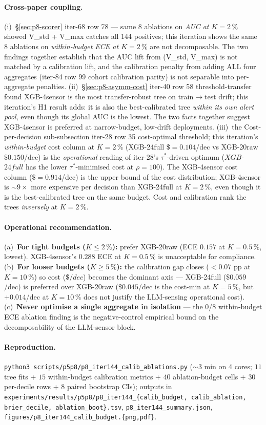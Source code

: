 \paragraph{Cross-paper coupling.}
(i)~\S\ref{sec:p8-scorer} iter-68 row 78 --- same 8 ablations on
\emph{AUC at $K{=}2\,\%$} showed V\_std + V\_max catches all 144
positives; this iteration shows the same 8 ablations on
\emph{within-budget ECE at $K{=}2\,\%$} are not decomposable. The
two findings together establish that the AUC lift from
(V\_std, V\_max) is not matched by a calibration lift, and the
calibration penalty from adding ALL four aggregates (iter-84 row
99 cohort calibration parity) is not separable into per-aggregate
penalties. (ii)~\S\ref{sec:p8-asymm-cost} iter-40 row
58 threshold-transfer found XGB-4sensor is the most
transfer-robust tree on train$\to$test drift; this iteration's H1
result adds: it is also the best-calibrated tree \emph{within its
own alert pool}, even though its global AUC is the lowest. The
two facts together suggest XGB-4sensor is preferred at
narrow-budget, low-drift deployments. (iii)~the Cost-per-decision
sub-subsection iter-28 row 35 cost-optimal threshold; this iteration's
\emph{within-budget} cost column at $K{=}2\,\%$ (XGB-24full
$\${=}0.104$/dec vs XGB-20raw $\$0.150$/dec) is the
\emph{operational} reading of iter-28's $\tau^*$-driven optimum
($XGB$-$24full$ has the lower $\tau^*$-minimised cost at
$\rho{=}100$). The XGB-4sensor cost column ($\${=}0.914$/dec) is
the upper bound of the cost distribution; XGB-4sensor is $\sim\!9\times$
more expensive per decision than XGB-24full at $K{=}2\,\%$, even
though it is the best-calibrated tree on the same budget. Cost
and calibration rank the trees \emph{inversely} at $K{=}2\,\%$.

\paragraph{Operational recommendation.}
(a)~\textbf{For tight budgets ($K \leq 2\,\%$):} prefer XGB-20raw
(ECE $0.157$ at $K{=}0.5\,\%$, lowest). XGB-4sensor's $0.288$ ECE
at $K{=}0.5\,\%$ is unacceptable for compliance. (b)~\textbf{For
looser budgets ($K \geq 5\,\%$):} the calibration gap closes
($<0.07$ pp at $K{=}10\,\%$) so cost ($\$/dec$) becomes the
dominant axis --- XGB-24full ($\$0.059$/dec) is preferred over
XGB-20raw ($\$0.045$/dec is the cost-min at $K{=}5\,\%$, but
$+0.014$/dec at $K{=}10\,\%$ does not justify the LLM-sensing
operational cost). (c)~\textbf{Never optimise a single
aggregate in isolation} --- the 0/8 within-budget ECE ablation
finding is the negative-control empirical bound on the
decomposability of the LLM-sensor block.

\paragraph{Reproduction.}
\texttt{python3 scripts/p5p8/p8\_iter144\_calib\_ablations.py}
(${\sim}3$ min on 4 cores; $11$ tree fits + $15$ within-budget
calibration metrics + $40$ ablation-budget cells + $30$ per-decile
rows + $8$ paired bootstrap CIs); outputs in
\texttt{experiments/results/p5p8/p8\_iter144\_\{calib\_budget,
calib\_ablation, brier\_decile, ablation\_boot\}.tsv},
\texttt{p8\_iter144\_summary.json},
\texttt{figures/p8\_iter144\_calib\_budget.\{png,pdf\}}.

